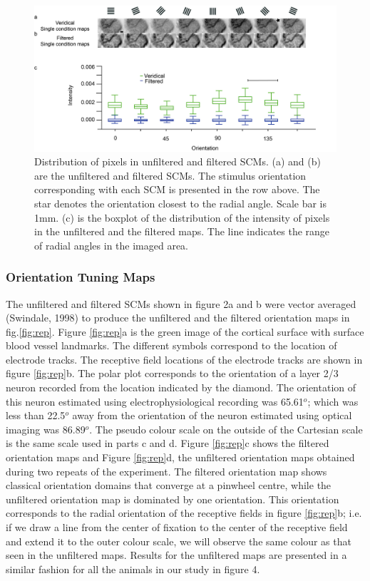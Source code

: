						\begin{figure}[H]
							
							\includegraphics[width=\linewidth]{rb/scms.jpg}
							\caption{Distribution of pixels in unfiltered and filtered SCMs. (a) and (b) are the unfiltered and filtered SCMs. The stimulus orientation corresponding with each SCM is presented in the row above. The star denotes the orientation closest to the radial angle. Scale bar is 1mm. (c) is the boxplot of the distribution of the intensity of pixels in the unfiltered and the filtered maps. The line indicates the range of radial angles in the imaged area.}
							\label{fig:scm}
						\end{figure}
					
		\subsubsection{Orientation Tuning Maps}
			The unfiltered and filtered SCMs shown in figure 2a and b were vector averaged (Swindale, 1998) to produce the unfiltered and the filtered orientation maps in fig.\ref{fig:rep}. Figure \ref{fig:rep}a is the green image of the cortical surface with surface blood vessel landmarks. The different symbols correspond to the location of electrode tracks. The receptive field locations of the electrode tracks are shown in figure \ref{fig:rep}b. The polar plot corresponds to the orientation of a layer 2/3 neuron recorded from the location indicated by the diamond. The orientation of this neuron estimated using electrophysiological recording was 65.61$^o$; which was less than 22.5$^o$ away from the orientation of the neuron estimated using optical imaging was 86.89$^o$. The pseudo colour scale on the outside of the Cartesian scale is the same scale used in parts c and d. Figure \ref{fig:rep}c shows the filtered orientation maps and Figure \ref{fig:rep}d, the unfiltered orientation maps obtained during two repeats of the experiment. The filtered orientation map shows classical orientation domains that converge at a pinwheel centre, while the unfiltered orientation map is dominated by one orientation. This orientation corresponds to the radial orientation of the receptive fields in figure \ref{fig:rep}b; i.e. if we draw a line from the center of fixation to the center of the receptive field and extend it to the outer colour scale, we will observe the same colour as that seen in the unfiltered maps. Results for the unfiltered maps are presented in a similar fashion for all the animals in our study in figure 4.
			
